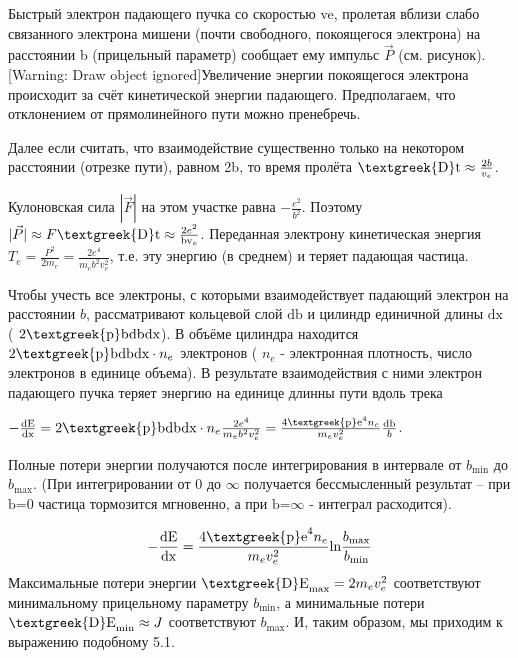\documentclass[a4paper,14pt, openany, twoside, draft]{extbook} %
\begin{document}
Быстрый электрон падающего пучка со скоростью ve, пролетая вблизи слабо связанного электрона мишени (почти свободного, покоящегося электрона) на расстоянии b (прицельный параметр) сообщает ему импульс  $\vec P$ (см. рисунок).  [Warning: Draw object ignored]Увеличение энергии покоящегося электрона происходит за счёт кинетической энергии падающего. Предполагаем, что отклонением от прямолинейного пути можно пренебречь.

Далее если считать, что взаимодействие существенно только на некотором расстоянии (отрезке пути), равном 2b, то время пролёта  ${\text{\textgreek{D}t}}\approx \frac{2b}{v_e}$.

Кулоновская сила  $|\overrightarrow F|$ на этом участке равна  $-\frac{e^2}{b^2}$.  Поэтому  $|\vec P|\approx F{\text{\textgreek{D}t}}\approx \frac{2e^2}{{\text{bv}}_e}$. Переданная электрону кинетическая энергия  $T_e=\frac{P^2}{2m_e}=\frac{2e^4}{m_eb^2v_e^2}$, т.е. эту энергию (в среднем) и теряет падающая частица.

Чтобы учесть все электроны, с которыми взаимодействует падающий электрон на расстоянии  $b$, рассматривают кольцевой слой  ${\text{db}}$ и цилиндр единичной длины  ${\text{dx}}$ ( $2{\text{\textgreek{p}bdbdx}}$). В объёме цилиндра находится  $2{\text{\textgreek{p}bdbdx}}\cdot n_e$ электронов ( $n_e$ - электронная плотность, число электронов в единице объема). В результате взаимодействия с ними электрон падающего пучка теряет энергию на единице длинны пути вдоль трека

 $-\frac{{\text{dE}}}{{\text{dx}}}=2{\text{\textgreek{p}bdbdx}}\cdot n_e\frac{2e^4}{m_eb^2v_e^2}=\frac{4{\text{\textgreek{p}e}}^4n_e}{m_ev_e^2}\frac{{\text{db}}} b$.\ \ \ \ \ \

Полные потери энергии получаются после интегрирования в интервале от  $b_{\text{min}}$ до  $b_{\text{max}}$. (При интегрировании от 0 до  $\infty $ получается бессмысленный результат – при  ${\text{b=}}0$ частица тормозится мгновенно, а при  ${\text{b=}}\infty $ - интеграл расходится).

\begin{equation*}
-\frac{{\text{dE}}}{{\text{dx}}}=\frac{4{\text{\textgreek{p}e}}^4n_e}{m_ev_e^2}\text{ln}\frac{b_{\text{max}}}{b_{\text{min}}}
\end{equation*}
Максимальные потери энергии  ${\text{\textgreek{D}E}}_{\text{max}}=2m_ev_e^2$ соответствуют минимальному прицельному параметру  $b_{\text{min}}$, а минимальные потери  ${\text{\textgreek{D}E}}_{\text{min}}\approx J$ соответствуют  $b_{\text{max}}$. И, таким образом, мы приходим к выражению подобному 5.1.
\end{document}
